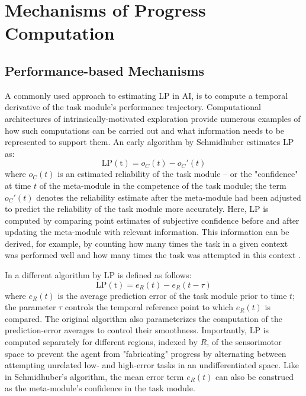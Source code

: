 \section{Mechanisms of Progress Computation}

\subsection{Performance-based Mechanisms}\label{subsec:performance-based_mechanisms}

A commonly used approach to estimating \ac{LP} in \ac{AI}, is to compute a temporal derivative of the task module's performance trajectory. Computational architectures of intrinsically-motivated exploration provide numerous examples of how such computations can be carried out and what information needs to be represented to support them. An early algorithm by Schmidhuber \parencite{schmidhuber_curious_1991} estimates \ac{LP} as:
\begin{equation}
    \mathrm{LP(t)} = o_C(t) - o_C'(t)
\end{equation}
where $o_C(t)$ is an estimated reliability of the task module -- or the "confidence" at time $t$ of the meta-module in the competence of the task module; the term $o_C'(t)$ denotes the reliability estimate after the meta-module had been adjusted to predict the reliability of the task module more accurately. Here, \ac{LP} is computed by comparing point estimates of subjective confidence before and after updating the meta-module with relevant information. This information can be derived, for example, by counting how many times the task in a given context was performed well and how many times the task was attempted in this context \parencite{schmidhuber_curious_1991}.

In a different algorithm by \citeauthor{oudeyer_intrinsic_2007} \citeyearpar{oudeyer_intrinsic_2007} \ac{LP} is defined as follows:
\begin{equation}
    \mathrm{LP(t)} = e_R(t) - e_R(t-\tau)
\end{equation}
where $e_R(t)$ is the average prediction error of the task module prior to time $t$; the parameter $\tau$ controls the temporal reference point to which $e_R(t)$ is compared. The original algorithm also parameterizes the computation of the prediction-error averages to control their smoothness. Importantly, \ac{LP} is computed separately for different regions, indexed by $R$, of the sensorimotor space to prevent the agent from "fabricating" progress by alternating between attempting unrelated low- and high-error tasks in an undifferentiated space. Like in Schmidhuber's algorithm, the mean error term $e_R(t)$ can also be construed as the meta-module's confidence in the task module. 


